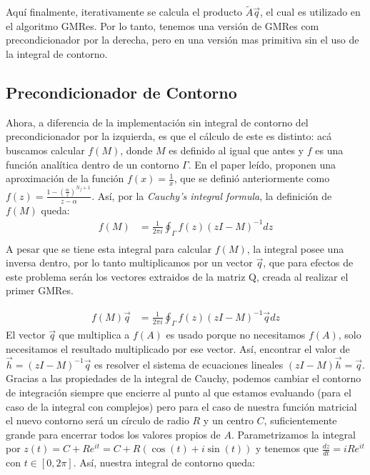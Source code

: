 \documentclass[fleqn]{article}
\begin{document}
Aquí finalmente, iterativamente se calcula el producto $\widetilde{A}\vec{q}$, el cual es utilizado en el algoritmo GMRes. Por lo tanto, tenemos una versión de GMRes com precondicionador por la derecha, pero en una versión mas primitiva sin el uso de la integral de contorno.
 

\subsection{Precondicionador de Contorno}

Ahora, a diferencia de la implementación sin integral de contorno del precondicionador por la izquierda, es que el cálculo de este es distinto: acá buscamos calcular $f(M)$, donde $M$ es definido al igual que antes y $f$ es una función analítica dentro de un contorno $\Gamma$. En el paper leído, proponen una aproximación de la función $f(x) = \displaystyle{\frac{1}{x}}$, que se definió anteriormente como $f(z) = \displaystyle{\frac{1 - (\frac{\alpha}{z})^{N_f + 1}}{z - \alpha}}$. Así, por la \textit{Cauchy's integral formula}, la definición de $f(M)$ queda:
\begin{align*}
    f(M) &= \frac{1}{2\pi i} \oint_{\Gamma} f(z)(zI - M)^{-1}dz \\
\end{align*}
A pesar que se tiene esta integral para calcular $f(M)$, la integral posee una inversa dentro, por lo tanto multiplicamos por un vector $\vec{q}$, que para efectos de este problema serán los vectores extraidos de la matriz Q, creada al realizar el primer GMRes.

\begin{align*}
    f(M)\vec{q} &= \frac{1}{2\pi i} \oint_{\Gamma} f(z)(zI - M)^{-1}\vec{q} dz
\end{align*}
\newpage
El vector $\vec{q}$ que multiplica a $f(A)$ es usado porque no necesitamos $f(A)$, solo necesitamos el resultado multiplicado por ese vector. Así, encontrar el valor de $\vec{h} = (zI - M)^{-1}\vec{q}$ es resolver el sistema de ecuaciones lineales $(zI - M)\vec{h} = \vec{q}$. Gracias a las propiedades de la integral de Cauchy, podemos cambiar el contorno de integración siempre que encierre al punto al que estamos evaluando (para el caso de la integral con complejos) pero para el caso de nuestra función matricial el nuevo contorno será un círculo de radio $R$ y un centro $C$, suficientemente grande para encerrar todos los valores propios de $A$. Parametrizamos la integral por $z(t) = C + Re^{it} = C + R(\cos(t) + i\sin(t))$ y tenemos que $\frac{dz}{dt} = iRe^{it}$ con $t \in [0,2\pi]$. Así, nuestra integral de contorno queda:
\end{document}
